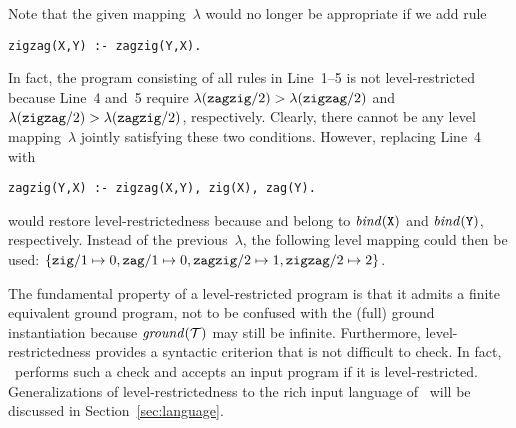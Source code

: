 \begin{oldstuff}
\begin{example}
Note that the given mapping~$\lambda$ would no longer be appropriate
if we add rule
%
\begin{lstlisting}[firstnumber=5]
zigzag(X,Y) :- zagzig(Y,X).
\end{lstlisting}
%
In fact, the program consisting of all rules in Line~1--5 is not
level-restricted because Line~4 and~5 require
$\lambda(\texttt{zagzig}/2) > \lambda(\texttt{zigzag}/2)$ and
$\lambda(\texttt{zigzag}/2) > \lambda(\texttt{zagzig}/2)$, respectively.
Clearly, there cannot be any level mapping~$\lambda$ jointly
satisfying these two conditions.
However, replacing Line~4 with
%
\begin{lstlisting}[firstnumber=4]
zagzig(Y,X) :- zigzag(X,Y), zig(X), zag(Y).
\end{lstlisting}
%
would restore level-restrictedness because
 and  belong to
$\mathit{bind}(\texttt{X})$ and $\mathit{bind}(\texttt{Y})$, respectively.
Instead of the previous~$\lambda$, the following level mapping could then be used:
\(
\{
\texttt{zig}/1 \mapsto 0,
\texttt{zag}/1 \mapsto 0,
\texttt{zagzig}/2\mapsto 1,
\texttt{zigzag}/2\mapsto 2
\}
\).\nolinebreak
\eexample
\end{example}

The fundamental property of a level-restricted
program is that it admits a finite equivalent ground program, not to be confused with
the (full) ground instantiation because $\mathit{ground}(\mathcal{T})$ may still be infinite.
Furthermore, level-restrictedness provides a syntactic criterion that is not
difficult to check.
In fact, \gringo\ performs such a check and accepts an input program if it is level-restricted.
Generalizations of level-restrictedness to the rich input language of \gringo\
will be discussed in Section~\ref{sec:language}.
\end{oldstuff}

